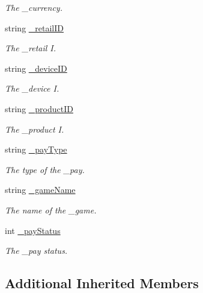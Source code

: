 \begin{DoxyCompactItemize}
\begin{DoxyCompactList}\small\item\em The \+\_\+currency. \end{DoxyCompactList}\item 
string \mbox{\hyperlink{class_t_net_1_1_contract_1_1_action_1_1_pay_normal_action_a0a5004266fc2f149ba50df44d9d8362b}{\+\_\+retail\+ID}}
\begin{DoxyCompactList}\small\item\em The \+\_\+retail I. \end{DoxyCompactList}\item 
string \mbox{\hyperlink{class_t_net_1_1_contract_1_1_action_1_1_pay_normal_action_a3760c549f700b7f2ee1bd1d1a45de85e}{\+\_\+device\+ID}}
\begin{DoxyCompactList}\small\item\em The \+\_\+device I. \end{DoxyCompactList}\item 
string \mbox{\hyperlink{class_t_net_1_1_contract_1_1_action_1_1_pay_normal_action_a1229a6101df1bb9a669eb1d0d4b7bacb}{\+\_\+product\+ID}}
\begin{DoxyCompactList}\small\item\em The \+\_\+product I. \end{DoxyCompactList}\item 
string \mbox{\hyperlink{class_t_net_1_1_contract_1_1_action_1_1_pay_normal_action_a406e773b2a27df84689b9121d09d745a}{\+\_\+pay\+Type}}
\begin{DoxyCompactList}\small\item\em The type of the \+\_\+pay. \end{DoxyCompactList}\item 
string \mbox{\hyperlink{class_t_net_1_1_contract_1_1_action_1_1_pay_normal_action_a5f69c8a6b9ff7e612872d749c61497c8}{\+\_\+game\+Name}}
\begin{DoxyCompactList}\small\item\em The name of the \+\_\+game. \end{DoxyCompactList}\item 
int \mbox{\hyperlink{class_t_net_1_1_contract_1_1_action_1_1_pay_normal_action_a71d25c5b201f33a6db62188f8786c7f5}{\+\_\+pay\+Status}}
\begin{DoxyCompactList}\small\item\em The \+\_\+pay status. \end{DoxyCompactList}\end{DoxyCompactItemize}
\subsection*{Additional Inherited Members}


